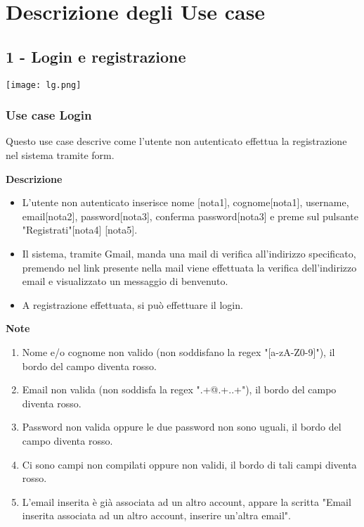 \documentclass[a4paper,12pt]{article}
\begin{document}
\section*{Descrizione degli Use case }


\subsection*{1 - Login e registrazione}

\begin{center}
  \texttt{[image: lg.png]}
\end{center}

\subsubsection*{Use case Login}

Questo use case descrive come l'utente non autenticato effettua la registrazione nel sistema tramite form.

\textbf{Descrizione}
\begin{itemize} \setlength\itemsep{0.01em}
\item L'utente non autenticato inserisce nome [nota1], cognome[nota1], username, email[nota2], password[nota3], conferma password[nota3] e preme sul pulsante "Registrati"[nota4] [nota5].
\item Il sistema, tramite Gmail, manda una mail di verifica all'indirizzo specificato, premendo nel link presente nella mail viene effettuata la verifica dell'indirizzo email e visualizzato un messaggio di benvenuto.
\item A registrazione effettuata, si può effettuare il login.
\end{itemize}

\textbf{Note}
\begin{enumerate} \setlength\itemsep{0.01em}
\item Nome e/o cognome non valido (non soddisfano la regex "[a-zA-Z0-9]"), il bordo del campo diventa rosso.
\item Email non valida (non soddisfa la regex ".+@.+..+"), il bordo del campo diventa rosso.
\item Password non valida oppure le due password non sono uguali, il bordo del campo diventa rosso.
\item Ci sono campi non compilati oppure non validi, il bordo di tali campi diventa rosso.
\item L'email inserita è già associata ad un altro account, appare la scritta "Email inserita associata ad un altro account, inserire un'altra email".
\end{enumerate}
\end{document}
